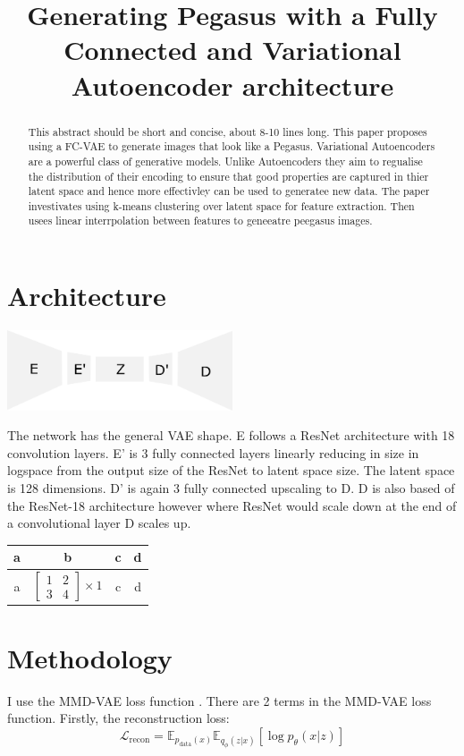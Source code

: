 \documentclass{article}
\title{Generating Pegasus with a Fully Connected and Variational Autoencoder architecture}
\begin{document}
\maketitle
\begin{abstract}
    This abstract should be short and concise, about 8-10 lines long.
    This paper proposes using a FC-VAE to generate images that look like a Pegasus.  Variational Autoencoders are a powerful class of generative models. Unlike Autoencoders they aim to regualise the distribution of their encoding to ensure that good properties are captured in thier latent space and hence more effectivley can be used to generatee new data. The paper investivates using k-means clustering over latent space for feature extraction. Then usees linear interrpolation between features to geneeatre peegasus images.
\end{abstract}

\section{Architecture}
\begin{center}
    \includegraphics[width=0.5\textwidth]{figures/Encoder.png}
\end{center}
The network has the general VAE shape. E follows a ResNet \cite{ResNet} architecture with 18 convolution layers. E' is 3 fully connected layers linearly reducing in size in logspace from the output size of the ResNet to latent space size. The latent space is 128 dimensions. D' is again 3 fully connected upscaling to D. D is also based of the ResNet-18 architecture however where ResNet would scale down at the end of a convolutional layer D scales up.



\begin{tabular}{c|c|c|c}
    a&b&c&d\\
    \hline
    a & $\begin{bmatrix} 1 & 2 \\ 3 & 4 \end{bmatrix} \times 1$&c&d\\
\end{tabular}


\section{Methodology}
I use the MMD-VAE loss function \cite{infovae}. 
There are 2 terms in the MMD-VAE loss function. Firstly, the reconstruction loss:
\begin{equation}
    \mathcal{L}_{\textrm{recon}} = \mathbb{E}_{p_{\textrm{data}}(x)} \mathbb{E}_{q_\phi (z|x)} [\log p_\theta(x|z)]
\end{equation}
\end{document}
